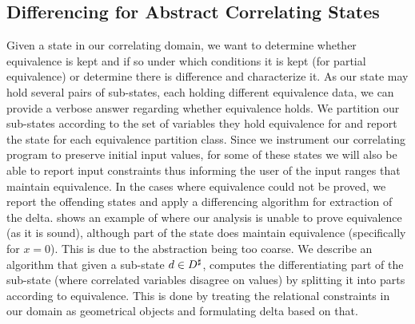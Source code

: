 \subsection{Differencing for Abstract Correlating States} 
Given a state in our correlating domain, we want to determine whether equivalence is kept and if so under which conditions it is kept (for partial equivalence) or determine there is difference and characterize it. As our state may hold several pairs of sub-states, each holding different equivalence data, we can provide a verbose answer regarding whether equivalence holds. We partition our sub-states according to the set of variables they hold equivalence for and report the state for each equivalence partition class. Since we instrument our correlating program to preserve initial input values, for some of these states we will also be able to report input constraints thus informing the user of the input ranges that maintain equivalence. In the cases where equivalence could not be proved, we report the offending states and apply a differencing algorithm for extraction of the delta.  shows an example of where our analysis is unable to prove equivalence (as it is sound), although part of the state does maintain equivalence (specifically for $x=0$). This is due to the abstraction being too coarse. We describe an algorithm that given a sub-state $d \in D^\sharp$, computes the differentiating part of the sub-state (where correlated variables disagree on values) by splitting it into parts according to equivalence. This is done by treating the relational constraints in our domain as geometrical objects and formulating delta based on that.

